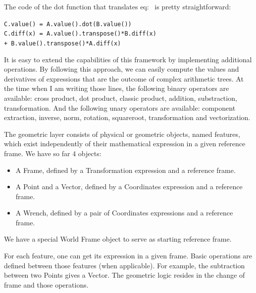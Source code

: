 
The code of the dot function that translates eq:~ is pretty straightforward:
\begin{center}
{\tt C.value() = A.value().dot(B.value())\\
C.diff(x) = A.value().transpose()*B.diff(x) \\ + B.value().transpose()*A.diff(x)}
\end{center}

It is easy to extend the capabilities of this framework by implementing additional operations.
By following this approach, we can easily compute the values and derivatives of expressions that are the outcome of complex arithmetic trees.
At the time when I am writing those lines, the following binary operators are available: cross product, dot product, classic product, addition, substraction, transformation.
And the following unary operators are available: component extraction, inverse, norm, rotation, squareroot, transformation and vectorization.

The geometric layer consists of physical or geometric objects, named features, which exist independently of their mathematical expression in a given reference frame.
We have so far 4 objects:
\begin{itemize}
  \item A Frame, defined by a Transformation expression and a reference frame.
  \item A Point and a Vector, defined by a Coordinates expression and a reference frame.
  \item A Wrench, defined by a pair of Coordinates expressions and a reference frame.
\end{itemize}
We have a special World Frame object to serve as starting reference frame.

For each feature, one can get its expression in a given frame.
Basic operations are defined between those features (when applicable).
For example, the subtraction between two Points gives a Vector.
The geometric logic resides in the change of frame and those operations.

